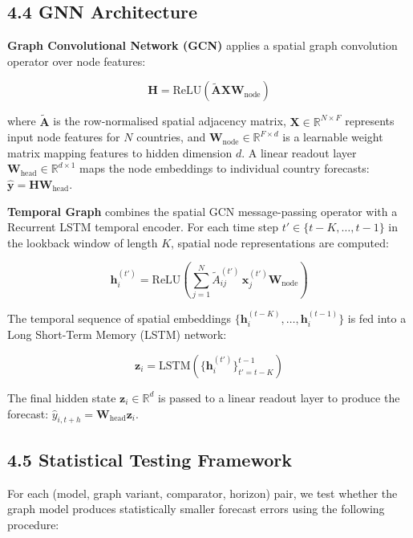 \documentclass[
]{article}
\begin{document}
\subsection{4.4 GNN Architecture}\label{gnn-architecture}

\textbf{Graph Convolutional Network (GCN)} applies a spatial graph convolution operator over node features:

\[\mathbf{H} = \mathrm{ReLU}\!\left(\tilde{\mathbf{A}}\mathbf{X}\mathbf{W}_{\text{node}}\right)\]

where \(\tilde{\mathbf{A}}\) is the row-normalised spatial adjacency matrix, \(\mathbf{X} \in \mathbb{R}^{N \times F}\) represents input node features for \(N\) countries, and \(\mathbf{W}_{\text{node}} \in \mathbb{R}^{F \times d}\) is a learnable weight matrix mapping features to hidden dimension \(d\). A linear readout layer \(\mathbf{W}_{\text{head}} \in \mathbb{R}^{d \times 1}\) maps the node embeddings to individual country forecasts: \(\hat{\mathbf{y}} = \mathbf{H}\mathbf{W}_{\text{head}}\).

\textbf{Temporal Graph} combines the spatial GCN message-passing operator with a Recurrent LSTM temporal encoder. For each time step \(t' \in \{t-K, \dots, t-1\}\) in the lookback window of length \(K\), spatial node representations are computed:

\[\mathbf{h}_i^{(t')} = \mathrm{ReLU}\!\left(\sum_{j=1}^N \tilde{A}_{ij}^{(t')}\,\mathbf{x}_j^{(t')}\mathbf{W}_{\text{node}}\right)\]

The temporal sequence of spatial embeddings \(\{\mathbf{h}_i^{(t-K)}, \dots, \mathbf{h}_i^{(t-1)}\}\) is fed into a Long Short-Term Memory (LSTM) network:

\[\mathbf{z}_i = \mathrm{LSTM}\!\left(\{\mathbf{h}_i^{(t')}\}_{t'=t-K}^{t-1}\right)\]

The final hidden state \(\mathbf{z}_i \in \mathbb{R}^d\) is passed to a linear readout layer to produce the forecast: \(\hat{y}_{i, t+h} = \mathbf{W}_{\text{head}}\mathbf{z}_i\).

\subsection{4.5 Statistical Testing
Framework}\label{statistical-testing-framework}

For each (model, graph variant, comparator, horizon) pair, we test
whether the graph model produces statistically smaller forecast errors
using the following procedure:
\end{document}
